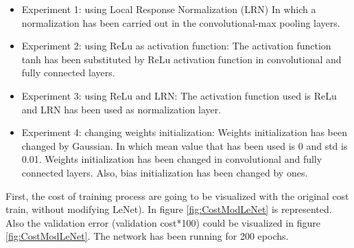 \begin{itemize}
\item{Experiment 1: using Local Response Normalization (LRN) In which a normalization has been carried out in the convolutional-max pooling layers.}
\item{Experiment 2: using ReLu as activation function:} The activation function tanh has been substituted by ReLu activation function in convolutional and fully connected layers.
\item{Experiment 3: using ReLu and LRN}: The activation function used is ReLu and LRN has been used as  normalization layer.
\item{Experiment 4: changing weights initialization}: Weights initialization has been changed by Gaussian. In which mean value that has been used is 0 and std is 0.01. Weights initialization has been changed in convolutional and fully connected layers. Also, bias initialization has been changed by ones.
\end{itemize}


First, the cost of training process are going to be visualized with the original cost train, without modifying LeNet). In figure \ref{fig:CostModLeNet} is represented. Also the validation error (validation cost*100) could be visualized in figure \ref{fig:CostModLeNet}. The network has been running for 200 epochs.\\


